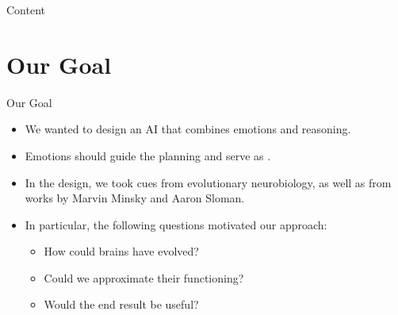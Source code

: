    
   \begin{frame}{Content}
      \tableofcontents
   \end{frame}
   
   \section{Our Goal}
   
   \begin{frame}{Our Goal}
      \begin{itemize}
         \item We wanted to design an AI that combines emotions and reasoning.
         
         \medskip
         
         \item Emotions should guide the planning and serve as .
         
         \medskip
         
         \item In the design, we took cues from evolutionary neurobiology, as well as from works by Marvin Minsky and Aaron Sloman.
         
         \medskip
         
         \item In particular, the following questions motivated our approach:
         
         \begin{itemize}
            \item How could brains have evolved?
            \item Could we approximate their functioning?
            \item Would the end result be useful?
         \end{itemize}
      \end{itemize}
   \end{frame}
   
